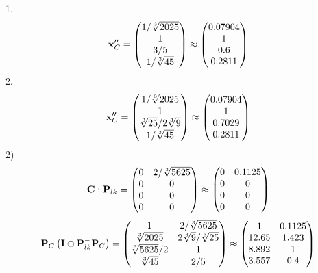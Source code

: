 \documentclass[10pt,a4paper]{article}
\begin{document}
	1.
	\[
		\bold{x}''_{C} = 
		\begin{pmatrix}
			{1} / {\sqrt[3]{2025}} \\
			{1}{} \\
			{{3}} / {{5}} \\
			{1} / {\sqrt[3]{45}} \\
		\end{pmatrix}
		\approx
		\begin{pmatrix}
			0.07904  \\
			1        \\
			0.6      \\
			0.2811   \\
		\end{pmatrix}
	\]
	2.
	\[
		\bold{x}''_{C} = 
		\begin{pmatrix}
			{1} / {\sqrt[3]{2025}} \\
			{1}{} \\
			{\sqrt[3]{25}} / {{2}\sqrt[3]{9}} \\
			{1} / {\sqrt[3]{45}} \\
		\end{pmatrix}
		\approx
		\begin{pmatrix}
			0.07904  \\
			1        \\
			0.7029   \\
			0.2811   \\
		\end{pmatrix}
	\]
	2)
	\[
		\bold{C}: \bold{P}_{lk} = 
		\begin{pmatrix}
			{{0}}{} & {{2}} / {\sqrt[3]{5625}} \\
			{{0}}{} & {{0}}{} \\
			{{0}}{} & {{0}}{} \\
			{{0}}{} & {{0}}{} \\
		\end{pmatrix}
		\approx
		\begin{pmatrix}
			0        & 0.1125   \\
			0        & 0        \\
			0        & 0        \\
			0        & 0        \\
		\end{pmatrix}
	\]
	\[
		\bold{P}_{C}\left(\bold{I} \oplus \bold{P}_{lk}^{-}\bold{P}_{C}\right) = 
		\begin{pmatrix}
			{1}{} & {{2}} / {\sqrt[3]{5625}} \\
			{\sqrt[3]{2025}}{} & {{2}\sqrt[3]{9}} / {\sqrt[3]{25}} \\
			{\sqrt[3]{5625}} / {{2}} & {1}{} \\
			{\sqrt[3]{45}}{} & {{2}} / {{5}} \\
		\end{pmatrix}
		\approx
		\begin{pmatrix}
			1        & 0.1125   \\
			12.65    & 1.423    \\
			8.892    & 1        \\
			3.557    & 0.4      \\
		\end{pmatrix}
	\]
\end{document}
